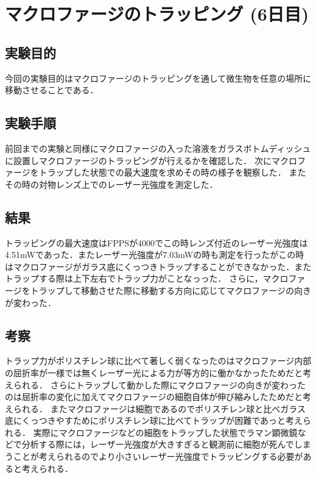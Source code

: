 \documentclass[11pt, a4paper,twocolumn]{jarticle}
\begin{document}
\section{マクロファージのトラッピング (6日目)}
\subsection{実験目的}
今回の実験目的はマクロファージのトラッピングを通して微生物を任意の場所に移動させることである．

\subsection{実験手順}
前回までの実験と同様にマクロファージの入った溶液をガラスボトムディッシュに設置しマクロファージのトラッピングが行えるかを確認した．
次にマクロファージをトラップした状態での最大速度を求めその時の様子を観察した．
またその時の対物レンズ上でのレーザー光強度を測定した．


\subsection{結果}
トラッピングの最大速度はFPPSが4000でこの時レンズ付近のレーザー光強度は4.51mWであった．またレーザー光強度が7.03mWの時も測定を行ったがこの時はマクロファージがガラス底にくっつきトラップすることができなかった．またトラップする際は上下左右でトラップ力がことなっった．
さらに，マクロファージをトラップして移動させた際に移動する方向に応じてマクロファージの向きが変わった．

\subsection{考察}
トラップ力がポリスチレン球に比べて著しく弱くなったのはマクロファージ内部の屈折率が一様では無くレーザー光による力が等方的に働かなかったためだと考えられる．
さらにトラップして動かした際にマクロファージの向きが変わったのは屈折率の変化に加えてマクロファージの細胞自体が伸び縮みしたためだと考えられる．
またマクロファージは細胞であるのでポリスチレン球と比べガラス底にくっつきやすためにポリスチレン球に比べてトラップが困難であっと考えられる．
実際にマクロファージなどの細胞をトラップした状態でラマン顕微鏡などで分析する際には，レーザー光強度が大きすぎると観測前に細胞が死んでしまうことが考えられるのでより小さいレーザー光強度でトラッピングする必要があると考えられる．


\newpage
\end{document}
